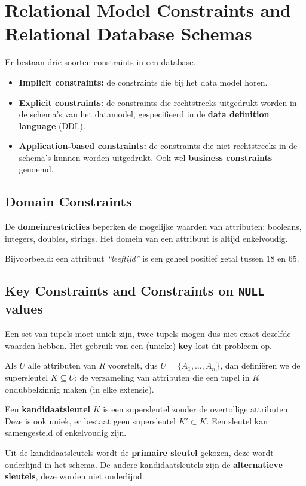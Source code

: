 \section{Relational Model Constraints and Relational Database Schemas}
Er bestaan drie soorten constraints in een database.
\begin{itemize}
	\item \textbf{Implicit constraints:} de constraints die bij het data model horen.
	\item \textbf{Explicit constraints:} de constraints die rechtstreeks uitgedrukt worden in de schema's van het datamodel, gespecifieerd in de \textbf{data definition language} (DDL).
	\item \textbf{Application-based constraints:} de constraints die niet rechtstreeks in de schema's kunnen worden uitgedrukt. Ook wel \textbf{business constraints} genoemd.
\end{itemize}

\subsection{Domain Constraints}
De \textbf{domeinrestricties} beperken de mogelijke waarden van attributen: booleans, integers, doubles, strings. Het domein van een attribuut is altijd enkelvoudig.

Bijvoorbeeld: een attribuut \textit{``leeftijd''} is een geheel positief getal tussen 18 en 65. 

\subsection{Key Constraints and Constraints on \texttt{NULL} values}
Een set van tupels moet uniek zijn, twee tupels mogen dus niet exact dezelfde waarden hebben. Het gebruik van een (unieke) \textbf{key} lost dit probleem op.

Als $U$ alle attributen van $R$ voorstelt, dus $U = \{A_1,\dots,A_n\}$, dan defini\"eren we de supersleutel $K \subseteq U$: de verzameling van attributen die een tupel in $R$ ondubbelzinnig maken (in elke extensie).

Een \textbf{kandidaatsleutel} $K$ is een supersleutel zonder de overtollige attributen. Deze is ook uniek, er bestaat geen supersleutel $K' \subset K$. Een sleutel kan samengesteld of enkelvoudig zijn.

Uit de kandidaatsleutels wordt de \textbf{primaire sleutel} gekozen, deze wordt onderlijnd in het schema. De andere kandidaatsleutels zijn de \textbf{alternatieve sleutels}, deze worden niet onderlijnd.

